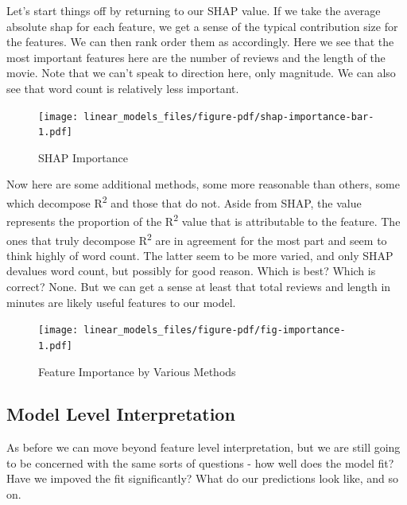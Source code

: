\documentclass[
  letterpaper,
]{krantz}
\begin{document}
Let's start things off by returning to our SHAP value. If we take the
average absolute shap for each feature, we get a sense of the typical
contribution size for the features. We can then rank order them as
accordingly. Here we see that the most important features here are the
number of reviews and the length of the movie. Note that we can't speak
to direction here, only magnitude. We can also see that word count is
relatively less important.

\begin{figure}

{\centering \texttt{[image: linear\_models\_files/figure-pdf/shap-importance-bar-1.pdf]}

}

\caption{SHAP Importance}

\end{figure}

Now here are some additional methods, some more reasonable than others,
some which decompose R\textsuperscript{2} and those that do not. Aside
from SHAP, the value represents the proportion of the
R\textsuperscript{2} value that is attributable to the feature. The ones
that truly decompose R\textsuperscript{2} are in agreement for the most
part and seem to think highly of word count. The latter seem to be more
varied, and only SHAP devalues word count, but possibly for good reason.
Which is best? Which is correct? None. But we can get a sense at least
that total reviews and length in minutes are likely useful features to
our model.

\begin{figure}

{\centering \texttt{[image: linear\_models\_files/figure-pdf/fig-importance-1.pdf]}

}

\caption{\label{fig-importance}Feature Importance by Various Methods}

\end{figure}

\subsection{Model Level
Interpretation}\label{model-level-interpretation}

As before we can move beyond feature level interpretation, but we are
still going to be concerned with the same sorts of questions - how well
does the model fit? Have we impoved the fit significantly? What do our
predictions look like, and so on.
\end{document}
